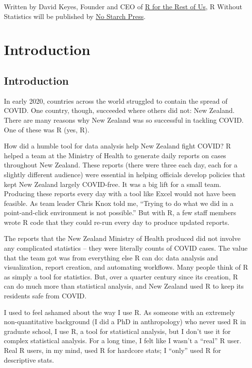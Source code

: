 \documentclass[
]{book}
\begin{document}
Written by David Keyes, Founder and CEO of \href{https://rfortherestofus.com/}{R for the Rest of Us}, R Without Statistics will be published by \href{https://nostarch.com/}{No Starch Press}.

\hypertarget{part-introduction}{%
\part*{Introduction}\label{part-introduction}}

\hypertarget{introduction}{%
\chapter{Introduction}\label{introduction}}

In early 2020, countries across the world struggled to contain the spread of COVID. One country, though, succeeded where others did not: New Zealand. There are many reasons why New Zealand was so successful in tackling COVID. One of these was R (yes, R).

How did a humble tool for data analysis help New Zealand fight COVID? R helped a team at the Ministry of Health to generate daily reports on cases throughout New Zealand. These reports (there were three each day, each for a slightly different audience) were essential in helping officials develop policies that kept New Zealand largely COVID-free. It was a big lift for a small team. Producing these reports every day with a tool like Excel would not have been feasible. As team leader Chris Knox told me, ``Trying to do what we did in a point-and-click environment is not possible.'' But with R, a few staff members wrote R code that they could re-run every day to produce updated reports.

The reports that the New Zealand Ministry of Health produced did not involve any complicated statistics -- they were literally counts of COVID cases. The value that the team got was from everything else R can do: data analysis and visualization, report creation, and automating workflows. Many people think of R as simply a tool for statistics. But, over a quarter century since its creation, R can do much more than statistical analysis, and New Zealand used R to keep its residents safe from COVID.

I used to feel ashamed about the way I use R. As someone with an extremely non-quantitative background (I did a PhD in anthropology) who never used R in graduate school, I use R, a tool for statistical analysis, but I don't use it for complex statistical analysis. For a long time, I felt like I wasn't a ``real'' R user. Real R users, in my mind, used R for hardcore stats; I ``only'' used R for descriptive stats.
\end{document}
